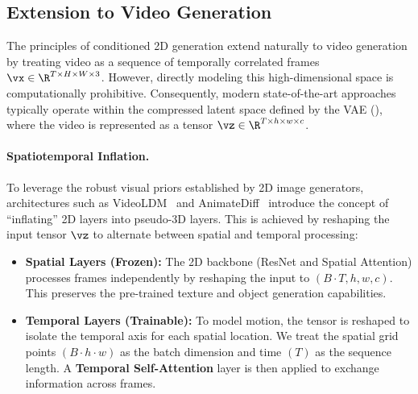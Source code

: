 \documentclass[../../book-main.tex]{subfiles}
\begin{document}
\subsection{Extension to Video Generation}
\label{subsec:video_gen}

The principles of conditioned 2D generation extend naturally to video generation by treating video as a sequence of temporally correlated frames \(\vx \in \R^{T \times H \times W \times 3}\).
However, directly modeling this high-dimensional space is computationally prohibitive. Consequently, modern state-of-the-art approaches typically operate within the compressed latent space defined by the VAE (), where the video is represented as a tensor \(\vz \in \R^{T \times h \times w \times c}\).

\paragraph{Spatiotemporal Inflation.}
To leverage the robust visual priors established by 2D image generators, architectures such as VideoLDM~\citep{blattmann2023align} and AnimateDiff~\citep{guo2023animatediff} introduce the concept of ``inflating'' 2D layers into pseudo-3D layers.
This is achieved by reshaping the input tensor \(\vz\) to alternate between spatial and temporal processing:
\begin{itemize}
    \item \textbf{Spatial Layers (Frozen):} The 2D backbone (ResNet and Spatial Attention) processes frames independently by reshaping the input to \((B \cdot T, h, w, c)\).
This preserves the pre-trained texture and object generation capabilities.
    \item \textbf{Temporal Layers (Trainable):} To model motion, the tensor is reshaped to isolate the temporal axis for each spatial location.
We treat the spatial grid points \((B \cdot h \cdot w)\) as the batch dimension and time \((T)\) as the sequence length.
A \textbf{Temporal Self-Attention} layer is then applied to exchange information across frames.
\end{itemize}
\end{document}

